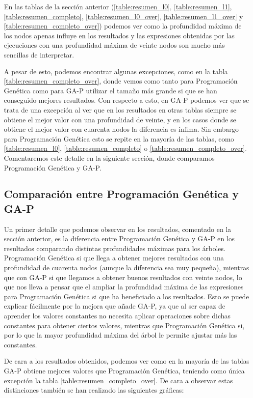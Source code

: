 En las tablas de la sección anterior (\ref{table:resumen_l0}, \ref{table:resumen_l1}, \ref{table:resumen_completo}, \ref{table:resumen_l0_over}, \ref{table:resumen_l1_over} y \ref{table:resumen_completo_over}) podemos ver como la profundidad máxima de los nodos apenas influye en los resultados y las expresiones obtenidas por las ejecuciones con una profundidad máxima de veinte nodos son mucho más sencillas de interpretar.

A pesar de esto, podemos encontrar algunas excepciones, como en la tabla \ref{table:resumen_completo_over}, donde vemos como tanto para Programación Genética como para GA-P utilizar el tamaño más grande si que se han conseguido mejores resultados. Con respecto a esto, en GA-P podemos ver que se trata de una excepción al ver que en los resultados en otras tablas siempre se obtiene el mejor valor con una profundidad de veinte, y en los casos donde se obtiene el mejor valor con cuarenta nodos la diferencia es ínfima. Sin embargo para Programación Genética esto se repite en la mayoría de las tablas, como \ref{table:resumen_l0}, \ref{table:resumen_completo} o \ref{table:resumen_completo_over}. Comentaremos este detalle en la siguiente sección, donde comparamos Programación Genética y GA-P.

\newpage

\subsection{Comparación entre Programación Genética y GA-P}

Un primer detalle que podemos observar en los resultados, comentado en la sección anterior, es la diferencia entre Programación Genética y GA-P en los resultados comparando distintas profundidades máximas para los árboles. Programación Genética si que llega a obtener mejores resultados con una profundidad de cuarenta nodos (aunque la diferencia sea muy pequeña), mientras que con GA-P si que llegamos a obtener buenos resultados con veinte nodos, lo que nos lleva a pensar que el ampliar la profundidad máxima de las expresiones para Programación Genética si que ha beneficiado a los resultados. Esto se puede explicar fácilmente por la mejora que añade GA-P, ya que al ser capaz de aprender los valores constantes no necesita aplicar operaciones sobre dichas constantes para obtener ciertos valores, mientras que Programación Genética si, por lo que la mayor profundidad máxima del árbol le permite ajustar más las constantes.

De cara a los resultados obtenidos, podemos ver como en la mayoría de las tablas GA-P obtiene mejores valores que Programación Genética, teniendo como única excepción la tabla \ref{table:resumen_completo_over}. De cara a observar estas distinciones también se han realizado las siguientes gráficas:

